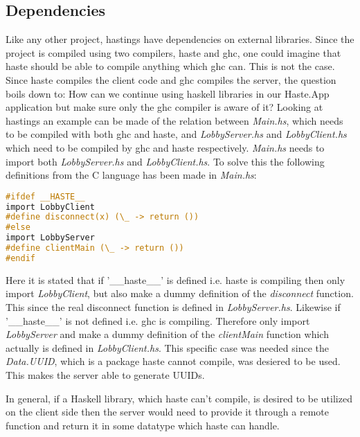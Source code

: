 \documentclass[a4paper]{article}
\begin{document}
\subsection{Dependencies} 
\label{sub:dependencies}
Like any other project, hastings have dependencies on external libraries. Since the project is compiled using two compilers, haste and ghc, one could imagine that haste should be able to compile anything which ghc can. This is not the case. Since haste compiles the client code and ghc compiles the server, the question boils down to: How can we continue using haskell libraries in our Haste.App application but make sure only the ghc compiler is aware of it? Looking at hastings an example can be made of the relation between \textit{Main.hs}, which needs to be compiled with both ghc and haste, and \textit{LobbyServer.hs} and \textit{LobbyClient.hs} which need to be compiled by ghc and haste respectively. 
\textit{Main.hs} needs to import both \textit{LobbyServer.hs} and \textit{LobbyClient.hs}. To solve this the following definitions from the C language has been made in \textit{Main.hs}:
\begin{lstlisting}[language=C]
#ifdef __HASTE__
import LobbyClient
#define disconnect(x) (\_ -> return ())
#else
import LobbyServer
#define clientMain (\_ -> return ())
#endif
\end{lstlisting}
Here it is stated that if '\_\_haste\_\_' is defined i.e. haste is compiling then only import \textit{LobbyClient}, but also make a dummy definition of the \textit{disconnect} function. This since the real disconnect function is defined in \textit{LobbyServer.hs}. Likewise if '\_\_haste\_\_' is not defined i.e. ghc is compiling. Therefore only import \textit{LobbyServer} and make a dummy definition of the \textit{clientMain} function which actually is defined in \textit{LobbyClient.hs}. This specific case was needed since the \textit{Data.UUID}, which is a package haste cannot compile, was desiered to be used. This makes the server able to generate UUIDs.

In general, if a Haskell library, which haste can't compile, is desired to be utilized on the client side then the server would need to provide it through a remote function and return it in some datatype which haste can handle.
\end{document}
